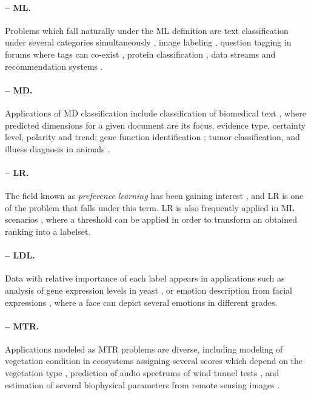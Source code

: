 \paragraph{-- ML.} Problems which fall naturally under the ML definition are text classification under several categories simultaneously \cite{aml-text}, image labeling \cite{aml-scene}, question tagging in forums where tags can co-exist \cite{aml-question}, protein classification \cite{aml-protein}{, data streams \cite{Sousa2018} and recommendation systems \cite{Laghmari2018}}.

\paragraph{-- MD.} Applications of MD classification include classification of biomedical text \cite{mdc}, where predicted dimensions for a given document are its focus, evidence type, certainty level, polarity and trend; gene function identification \cite{md-bayes}; tumor classification, and illness diagnosis in animals \cite{md-bayes2}.

\paragraph{-- LR.} The field known as \emph{preference learning} has been gaining interest \cite{lrankpairwise}, and LR is one of the problem that falls under this term. LR is also frequently applied in ML scenarios \cite{lrank4ml}, where a threshold can be applied in order to transform an obtained ranking into a labelset.

\paragraph{-- LDL.} Data with relative importance of each label appears in applications such as analysis of gene expression levels in yeast \cite{aldl-yeast}, or emotion description from facial expressions \cite{aldl-face}, where a face can depict several emotions in different grades.

\paragraph{-- MTR.} Applications modeled as MTR problems are diverse, including modeling of vegetation condition in ecosystems assigning several scores which depend on the vegetation type \cite{amtr-eco}, prediction of audio spectrums of wind tunnel tests \cite{amtr-wind}, and estimation of several biophysical parameters from remote sensing images \cite{amtr-remote}.

